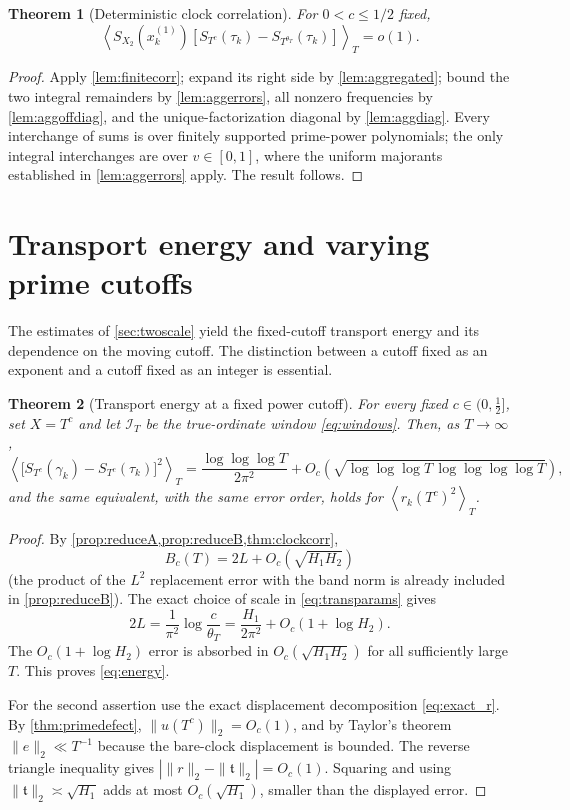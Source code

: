 \documentclass[11pt,reqno]{amsart}
\numberwithin{equation}{section}
\newtheorem{theorem}{Theorem}[section]
\newcommand{\av}[1]{\left\langle #1\right\rangle_T}
\begin{document}
\begin{theorem}[Deterministic clock correlation]\label{thm:clockcorr}
For $0<c\le1/2$ fixed,
\begin{equation}\label{eq:clockcorr}
\av{S_{X_2}(x_k^{(1)})
 [S_{T^c}(\tau_k)-S_{T^{\theta_T}}(\tau_k)]}=o(1).
\end{equation}
\end{theorem}
\begin{proof}
Apply \cref{lem:finitecorr}; expand its right side by
\cref{lem:aggregated}; bound the two integral remainders by
\cref{lem:aggerrors}, all nonzero frequencies by
\cref{lem:aggoffdiag}, and the unique-factorization diagonal
by \cref{lem:aggdiag}.  Every interchange of sums is over
finitely supported prime-power polynomials; the only integral
interchanges are over $v\in[0,1]$, where the uniform majorants
established in \cref{lem:aggerrors} apply.  The result follows.
\end{proof}



\section{Transport energy and varying prime cutoffs}\label{sec:energy}
The estimates of \cref{sec:twoscale} yield the fixed-cutoff transport
energy and its dependence on the moving cutoff.  The distinction
between a cutoff fixed as an exponent and a cutoff fixed as an integer
is essential.

\begin{theorem}[Transport energy at a fixed power cutoff]\label{thm:energy}
For every fixed $c\in(0,\tfrac12]$, set $X=T^c$ and let
$\mathcal I_T$ be the true-ordinate window \eqref{eq:windows}.
Then, as $T\to\infty$,
\begin{equation}\label{eq:energy}
\av{\bigl[S_{T^c}(\gamma_k)-S_{T^c}(\tau_k)\bigr]^2}
=\frac{\log\log\log T}{2\pi^2}
+O_c\!\left(\sqrt{\log\log\log T\,
                        \log\log\log\log T}\right),
\end{equation}
and the same equivalent, with the same error order, holds for
$\av{r_k(T^c)^2}$.
\end{theorem}
\begin{proof}
By \cref{prop:reduceA,prop:reduceB,thm:clockcorr},
\[
B_c(T)=2L+O_c(\sqrt{H_1H_2})
\]
(the product of the $L^2$ replacement error with the band
norm is already included in \cref{prop:reduceB}).
The exact choice of scale in \eqref{eq:transparams} gives
\[
2L=\frac1{\pi^2}\log\frac c{\theta_T}
=\frac{H_1}{2\pi^2}+O_c(1+\log H_2).
\]
The $O_c(1+\log H_2)$ error is absorbed in
$O_c(\sqrt{H_1H_2})$ for all sufficiently large $T$.
This proves \eqref{eq:energy}.

For the second assertion use the exact displacement decomposition
\eqref{eq:exact_r}.  By \cref{thm:primedefect},
$\|u(T^c)\|_2=O_c(1)$, and by Taylor's theorem
$\|e\|_2\ll T^{-1}$ because the bare-clock displacement is bounded.
The reverse triangle inequality gives
$|\|r\|_2-\|\mathfrak t\|_2|=O_c(1)$.
Squaring and using $\|\mathfrak t\|_2\asymp\sqrt{H_1}$ adds
at most $O_c(\sqrt{H_1})$, smaller than the displayed error.
\end{proof}
\end{document}
